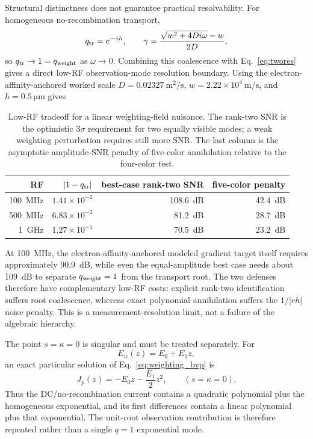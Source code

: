 \documentclass[11pt]{article}
\begin{document}
Structural distinctness does not guarantee practical resolvability. For homogeneous no-recombination transport,
\begin{equation}
q_{\rm tr}=e^{-\gamma h},\qquad
\gamma=\frac{\sqrt{w^2+4Di\omega}-w}{2D},
\end{equation}
so $q_{\rm tr}\to1=q_{\rm weight}$ as $\omega\to0$. Combining this coalescence with Eq.~\eqref{eq:twores} gives a direct low-RF observation-mode resolution boundary. Using the electron-affinity-anchored worked scale $D=0.02327~\mathrm{m^2/s}$, $w=2.22\times10^4~\mathrm{m/s}$, and $h=0.5~\si{\micro\meter}$ gives
\begin{table}[H]
\centering
\caption{Low-RF tradeoff for a linear weighting-field nuisance. The rank-two SNR is the optimistic $3\sigma$ requirement for two equally visible modes; a weak weighting perturbation requires still more SNR. The last column is the asymptotic amplitude-SNR penalty of five-color annihilation relative to the four-color test.}
\label{tab:weighting_coalescence}
\begin{tabular}{rrrr}
\toprule
RF & $|1-q_{\rm tr}|$ & best-case rank-two SNR & five-color penalty \\
\midrule
\SI{100}{MHz} & $1.41\times10^{-2}$ & \SI{108.6}{dB} & \SI{42.4}{dB} \\
\SI{500}{MHz} & $6.83\times10^{-2}$ & \SI{81.2}{dB} & \SI{28.7}{dB} \\
\SI{1}{GHz} & $1.27\times10^{-1}$ & \SI{70.5}{dB} & \SI{23.2}{dB} \\
\bottomrule
\end{tabular}
\end{table}
At \SI{100}{MHz}, the electron-affinity-anchored modeled gradient target itself requires approximately \SI{90.9}{dB}, while even the equal-amplitude best case needs about \SI{109}{dB} to separate $q_{\rm weight}=1$ from the transport root. The two defenses therefore have complementary low-RF costs: explicit rank-two identification suffers root coalescence, whereas exact polynomial annihilation suffers the $1/|rh|$ noise penalty. This is a measurement-resolution limit, not a failure of the algebraic hierarchy.

The point $s=\kappa=0$ is singular and must be treated separately. For
\begin{equation}
E_w(z)=E_0+E_1z,
\end{equation}
an exact particular solution of Eq.~\eqref{eq:weighting_bvp} is
\begin{equation}
\boxed{J_p(z)=-E_0z-\frac{E_1}{2}z^2,\qquad (s=\kappa=0).}
\label{eq:weighting_dc_particular}
\end{equation}
Thus the DC/no-recombination current contains a quadratic polynomial plus the homogeneous exponential, and its first differences contain a linear polynomial plus that exponential. The unit-root observation contribution is therefore repeated rather than a single $q=1$ exponential mode.
\end{document}
